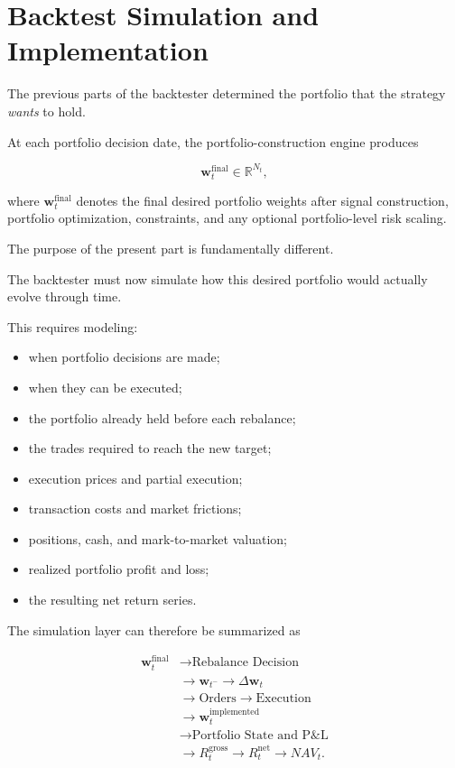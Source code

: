 \documentclass[11pt,a4paper]{article}
\begin{document}
\part{Backtest Simulation and Implementation}
\label{part:backtest_simulation_implementation}

The previous parts of the backtester determined the portfolio that the strategy
\emph{wants} to hold.

At each portfolio decision date, the portfolio-construction engine produces

\begin{equation}
\boxed{
\mathbf{w}_t^{\mathrm{final}}
\in
\mathbb{R}^{N_t},
}
\end{equation}

where $\mathbf{w}_t^{\mathrm{final}}$ denotes the final desired portfolio weights
after signal construction, portfolio optimization, constraints, and any optional
portfolio-level risk scaling.

The purpose of the present part is fundamentally different.

The backtester must now simulate how this desired portfolio would actually evolve
through time.

This requires modeling:

\begin{itemize}
    \item when portfolio decisions are made;
    \item when they can be executed;
    \item the portfolio already held before each rebalance;
    \item the trades required to reach the new target;
    \item execution prices and partial execution;
    \item transaction costs and market frictions;
    \item positions, cash, and mark-to-market valuation;
    \item realized portfolio profit and loss;
    \item the resulting net return series.
\end{itemize}

The simulation layer can therefore be summarized as

\begin{equation}
\boxed{
\begin{aligned}
\mathbf{w}_t^{\mathrm{final}}
&\rightarrow
\text{Rebalance Decision}
\\
&\rightarrow
\mathbf{w}_{t^-}
\rightarrow
\Delta\mathbf{w}_t
\\
&\rightarrow
\text{Orders}
\rightarrow
\text{Execution}
\\
&\rightarrow
\mathbf{w}_t^{\mathrm{implemented}}
\\
&\rightarrow
\text{Portfolio State and P\&L}
\\
&\rightarrow
R_t^{\mathrm{gross}}
\rightarrow
R_t^{\mathrm{net}}
\rightarrow
NAV_t.
\end{aligned}
}
\end{equation}
\end{document}
